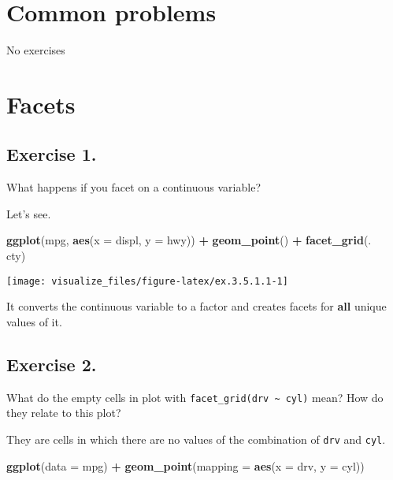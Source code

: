 \documentclass[]{book}
\newenvironment{Shaded}{\begin{snugshade}}{\end{snugshade}}
\newcommand{\DataTypeTok}[1]{\textcolor[rgb]{0.13,0.29,0.53}{#1}}
\newcommand{\KeywordTok}[1]{\textcolor[rgb]{0.13,0.29,0.53}{\textbf{#1}}}
\newcommand{\NormalTok}[1]{#1}
\newcommand{\OperatorTok}[1]{\textcolor[rgb]{0.81,0.36,0.00}{\textbf{#1}}}
\newcommand{\StringTok}[1]{\textcolor[rgb]{0.31,0.60,0.02}{#1}}
\theoremstyle{definition}
\theoremstyle{definition}
\theoremstyle{definition}
\theoremstyle{remark}
\begin{document}
\hypertarget{common-problems}{%
\section{Common problems}\label{common-problems}}

No exercises

\hypertarget{facets}{%
\section{Facets}\label{facets}}

\hypertarget{exercise-1.-2}{%
\subsection{Exercise 1.}\label{exercise-1.-2}}

What happens if you facet on a continuous variable?

Let's see.

\begin{Shaded}
\begin{Highlighting}[]
\KeywordTok{ggplot}\NormalTok{(mpg, }\KeywordTok{aes}\NormalTok{(}\DataTypeTok{x =}\NormalTok{ displ, }\DataTypeTok{y =}\NormalTok{ hwy)) }\OperatorTok{+}
\StringTok{  }\KeywordTok{geom_point}\NormalTok{() }\OperatorTok{+}\StringTok{ }
\StringTok{  }\KeywordTok{facet_grid}\NormalTok{(. }\OperatorTok{~}\StringTok{ }\NormalTok{cty)}
\end{Highlighting}
\end{Shaded}

\begin{center}\texttt{[image: visualize\_files/figure-latex/ex.3.5.1.1-1]} \end{center}

It converts the continuous variable to a factor and creates facets for
\textbf{all} unique values of it.

\hypertarget{exercise-2.-2}{%
\subsection{Exercise 2.}\label{exercise-2.-2}}

What do the empty cells in plot with
\texttt{facet\_grid(drv\ \textasciitilde{}\ cyl)} mean? How do they
relate to this plot?

They are cells in which there are no values of the combination of
\texttt{drv} and \texttt{cyl}.

\begin{Shaded}
\begin{Highlighting}[]
\KeywordTok{ggplot}\NormalTok{(}\DataTypeTok{data =}\NormalTok{ mpg) }\OperatorTok{+}\StringTok{ }
\StringTok{  }\KeywordTok{geom_point}\NormalTok{(}\DataTypeTok{mapping =} \KeywordTok{aes}\NormalTok{(}\DataTypeTok{x =}\NormalTok{ drv, }\DataTypeTok{y =}\NormalTok{ cyl))}
\end{Highlighting}
\end{Shaded}
\end{document}

